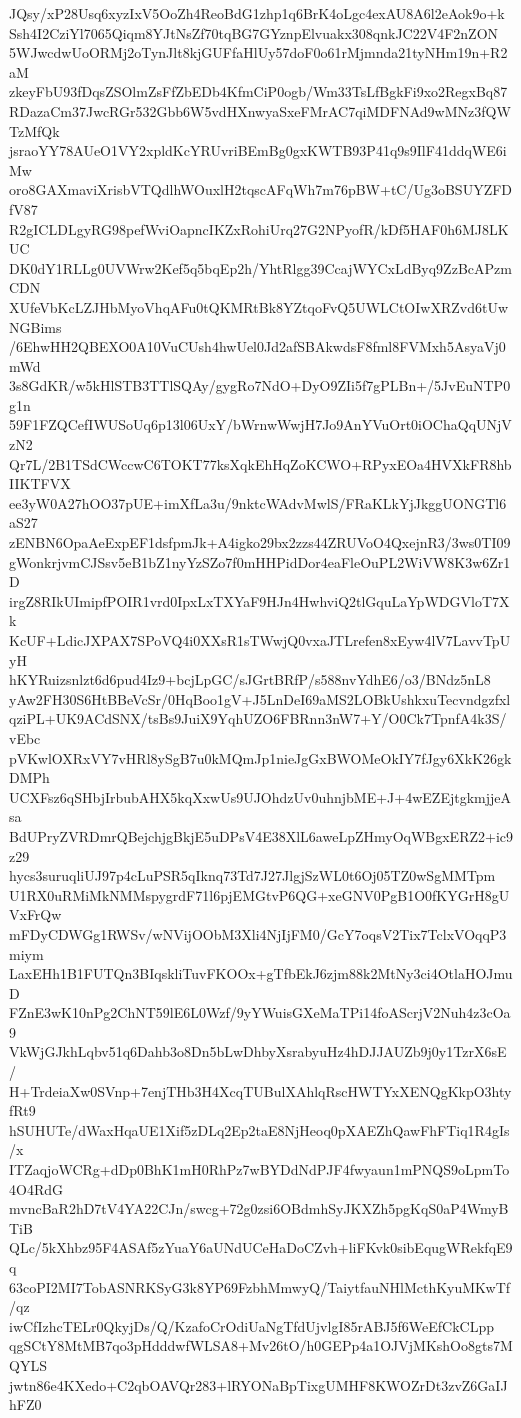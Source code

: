 JQsy/xP28Usq6xyzIxV5OoZh4ReoBdG1zhp1q6BrK4oLgc4exAU8A6l2eAok9o+k
Ssh4I2CziYl7065Qiqm8YJtNsZf70tqBG7GYznpElvuakx308qnkJC22V4F2nZON
5WJwcdwUoORMj2oTynJlt8kjGUFfaHlUy57doF0o61rMjmnda21tyNHm19n+R2aM
zkeyFbU93fDqsZSOlmZsFfZbEDb4KfmCiP0ogb/Wm33TsLfBgkFi9xo2RegxBq87
RDazaCm37JwcRGr532Gbb6W5vdHXnwyaSxeFMrAC7qiMDFNAd9wMNz3fQWTzMfQk
jsraoYY78AUeO1VY2xpldKcYRUvriBEmBg0gxKWTB93P41q9s9IlF41ddqWE6iMw
oro8GAXmaviXrisbVTQdlhWOuxlH2tqscAFqWh7m76pBW+tC/Ug3oBSUYZFDfV87
R2gICLDLgyRG98pefWviOapncIKZxRohiUrq27G2NPyofR/kDf5HAF0h6MJ8LKUC
DK0dY1RLLg0UVWrw2Kef5q5bqEp2h/YhtRlgg39CcajWYCxLdByq9ZzBcAPzmCDN
XUfeVbKcLZJHbMyoVhqAFu0tQKMRtBk8YZtqoFvQ5UWLCtOIwXRZvd6tUwNGBims
/6EhwHH2QBEXO0A10VuCUsh4hwUel0Jd2afSBAkwdsF8fml8FVMxh5AsyaVj0mWd
3s8GdKR/w5kHlSTB3TTlSQAy/gygRo7NdO+DyO9ZIi5f7gPLBn+/5JvEuNTP0g1n
59F1FZQCefIWUSoUq6p13l06UxY/bWrnwWwjH7Jo9AnYVuOrt0iOChaQqUNjVzN2
Qr7L/2B1TSdCWccwC6TOKT77ksXqkEhHqZoKCWO+RPyxEOa4HVXkFR8hbIIKTFVX
ee3yW0A27hOO37pUE+imXfLa3u/9nktcWAdvMwlS/FRaKLkYjJkggUONGTl6aS27
zENBN6OpaAeExpEF1dsfpmJk+A4igko29bx2zzs44ZRUVoO4QxejnR3/3ws0TI09
gWonkrjvmCJSsv5eB1bZ1nyYzSZo7f0mHHPidDor4eaFleOuPL2WiVW8K3w6Zr1D
irgZ8RIkUImipfPOIR1vrd0IpxLxTXYaF9HJn4HwhviQ2tlGquLaYpWDGVloT7Xk
KcUF+LdicJXPAX7SPoVQ4i0XXsR1sTWwjQ0vxaJTLrefen8xEyw4lV7LavvTpUyH
hKYRuizsnlzt6d6pud4Iz9+bcjLpGC/sJGrtBRfP/s588nvYdhE6/o3/BNdz5nL8
yAw2FH30S6HtBBeVcSr/0HqBoo1gV+J5LnDeI69aMS2LOBkUshkxuTecvndgzfxl
qziPL+UK9ACdSNX/tsBs9JuiX9YqhUZO6FBRnn3nW7+Y/O0Ck7TpnfA4k3S/vEbc
pVKwlOXRxVY7vHRl8ySgB7u0kMQmJp1nieJgGxBWOMeOkIY7fJgy6XkK26gkDMPh
UCXFsz6qSHbjIrbubAHX5kqXxwUs9UJOhdzUv0uhnjbME+J+4wEZEjtgkmjjeAsa
BdUPryZVRDmrQBejchjgBkjE5uDPsV4E38XlL6aweLpZHmyOqWBgxERZ2+ic9z29
hycs3suruqliUJ97p4cLuPSR5qIknq73Td7J27JlgjSzWL0t6Oj05TZ0wSgMMTpm
U1RX0uRMiMkNMMspygrdF71l6pjEMGtvP6QG+xeGNV0PgB1O0fKYGrH8gUVxFrQw
mFDyCDWGg1RWSv/wNVijOObM3Xli4NjIjFM0/GcY7oqsV2Tix7TclxVOqqP3miym
LaxEHh1B1FUTQn3BIqskliTuvFKOOx+gTfbEkJ6zjm88k2MtNy3ci4OtlaHOJmuD
FZnE3wK10nPg2ChNT59lE6L0Wzf/9yYWuisGXeMaTPi14foAScrjV2Nuh4z3cOa9
VkWjGJkhLqbv51q6Dahb3o8Dn5bLwDhbyXsrabyuHz4hDJJAUZb9j0y1TzrX6sE/
H+TrdeiaXw0SVnp+7enjTHb3H4XcqTUBulXAhlqRscHWTYxXENQgKkpO3htyfRt9
hSUHUTe/dWaxHqaUE1Xif5zDLq2Ep2taE8NjHeoq0pXAEZhQawFhFTiq1R4gIs/x
ITZaqjoWCRg+dDp0BhK1mH0RhPz7wBYDdNdPJF4fwyaun1mPNQS9oLpmTo4O4RdG
mvncBaR2hD7tV4YA22CJn/swcg+72g0zsi6OBdmhSyJKXZh5pgKqS0aP4WmyBTiB
QLc/5kXhbz95F4ASAf5zYuaY6aUNdUCeHaDoCZvh+liFKvk0sibEqugWRekfqE9q
63coPI2MI7TobASNRKSyG3k8YP69FzbhMmwyQ/TaiytfauNHlMcthKyuMKwTf/qz
iwCfIzhcTELr0QkyjDs/Q/KzafoCrOdiUaNgTfdUjvlgI85rABJ5f6WeEfCkCLpp
qgSCtY8MtMB7qo3pHdddwfWLSA8+Mv26tO/h0GEPp4a1OJVjMKshOo8gts7MQYLS
jwtn86e4KXedo+C2qbOAVQr283+lRYONaBpTixgUMHF8KWOZrDt3zvZ6GaIJhFZ0
